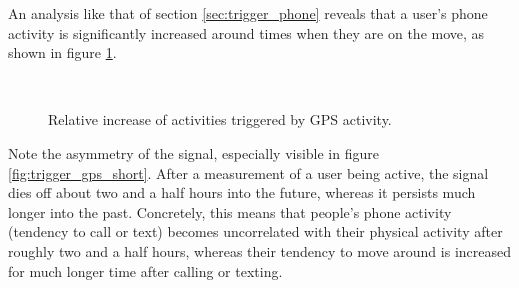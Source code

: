 An analysis like that of section \ref{sec:trigger_phone} reveals that a user's phone activity is significantly increased around times when they are on the move, as shown in figure \ref{fig:trigger_gps}.
\begin{figure} %
	\centering	
	 \\
	\caption{Relative increase of activities triggered by GPS activity.}
	\label{fig:trigger_gps}
\end{figure}
Note the asymmetry of the signal, especially visible in figure \ref{fig:trigger_gps_short}. After a measurement of a user being active, the signal dies off about two and a half hours into the future, whereas it persists much longer into the past. Concretely, this means that people's phone activity (tendency to call or text) becomes uncorrelated with their physical activity after roughly two and a half hours, whereas their tendency to move around is increased for much longer time after calling or texting.

